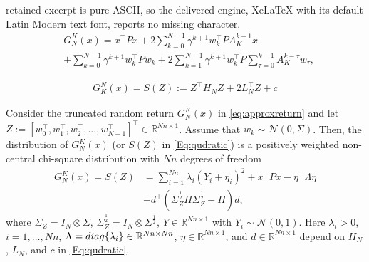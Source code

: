 \documentclass[10pt,a4paper]{amsart}
\begin{document}
retained excerpt is pure ASCII, so the delivered engine, XeLaTeX with its default Latin Modern text font, reports no missing character.
\begin{align}\label{eq:approxreturn}
    &{G}^{K}_N(x) =  x^{\top} P x  +  2 \sum_{k = 0 }^{N-1} \gamma^{k+1} w_k^{\top} P A_K^{k+1}x \nonumber \\
    &+  \sum_{k = 0 }^{N-1}  \gamma^{k+1}  w_k^{\top} P w_k + 
 2 \sum_{k = 1 }^{N-1} \gamma^{k+1} w_k^{\top} P \sum_{\tau=0}^{k-1} A_K^{k-\tau}w_{\tau},
\end{align}

        \begin{equation}\label{Eq:qudratic}
    \begin{aligned}
        G^N_K(x)=S(Z):= Z^\top H_NZ+ 2L_N^\top Z+ c
    \end{aligned}
\end{equation}

\begin{proposition}\label{The:density}
Consider the truncated random return $G^K_N(x)$ in \eqref{eq:approxreturn} and let $Z:=\left[w_0^\top,w_1^\top,w_2^\top,...,w_{N-1}^\top\right]^\top\in \mathbb{R}^{N n\times 1}$.  Assume that  $w_k\sim \mathcal{N}(0,\Sigma)$. Then, the distribution of  $G_{N}^{K}(x) $ (or $S(Z)$ in \eqref{Eq:qudratic}) is a positively weighted non-central chi-square distribution with $Nn$ degrees of freedom
    \begin{equation}
        \begin{aligned}
            G_{N}^{K}(x)=S(Z)&=\sum_{i=1}^{Nn}\lambda_i\left( Y_i+\eta_i \right)^2+x^\top Px-\eta^\top \Lambda \eta\\&+d^\top (\Sigma_Z^{\frac{1}{2}} H \Sigma_Z^{\frac{1}{2}}-H)d,
        \end{aligned}
    \end{equation}
where $\Sigma_Z=I_N\otimes \Sigma$, $\Sigma_Z^{\frac{1}{2}}=I_N \otimes \Sigma^{\frac{1}{2}}$, $Y\in \mathbb{R}^{Nn\times1}$ with $Y_i\sim
\mathcal{N}(0,1)$. Here $\lambda_i>0$, $i=1,\dots, Nn$, $\Lambda = {\rm diag}\{\lambda_i\}\in \mathbb{R}^{Nn\times Nn}$,  $\eta \in \mathbb{R}^{Nn\times1}$, and $d\in \mathbb{R}^{Nn\times1}$ depend on $H_N$, $L_N$, and $c$ in \eqref{Eq:qudratic}. 
\end{proposition}
\end{document}
